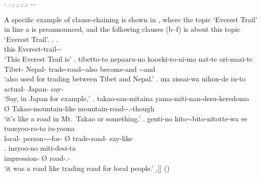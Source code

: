 %
\ex.
 \a. 
 \b. 
 \b. 
 \b. 
 \b. ...

A specific example of clause-chaining is shown in \Next,
where the topic `Everest Trail' in line a is preannounced,
and the following clauses (b--f) is about this topic `Everest Trail'.
%
\ex.
\ag.   \\
	this Everest-trail-- \\
	`{This Everest Trail} is'
\bg. tibetto-to nepaaru-no kooeki-ro-ni-mo nat-te ori-masi-te \\
	Tibet- Nepal- trade-road--also become-and --and \\
	`also used for trading  between Tibet and Nepal.'
\cg. ma zissai-wa nihon-de iu-to \tp{\dvline} \\
	 actual- Japan- say- \\
	`Say, in Japan for example,'
\dg. \EM{\O} takao-san-mitaina yama-miti-nan-desu-keredomo \\
	{\O} Takao-mountain-like mountain-road--.-though \\
	`it's like a road in Mt.\ Takao or something.'
\eg. genti-no hito$\sim$bito-nitotte-wa ee \EM{\O} tuusyoo-ro-to iu-yoona \\
	local- person$\sim$-for-  {\O} trade-road- say-like \\
\bg. insyoo-no \EM{\O} miti-desi-ta \\
	 impression- {\O} road-.- \\
 `{it} was a road like trading road for local people.'
 \b.[] \hfill{()}



